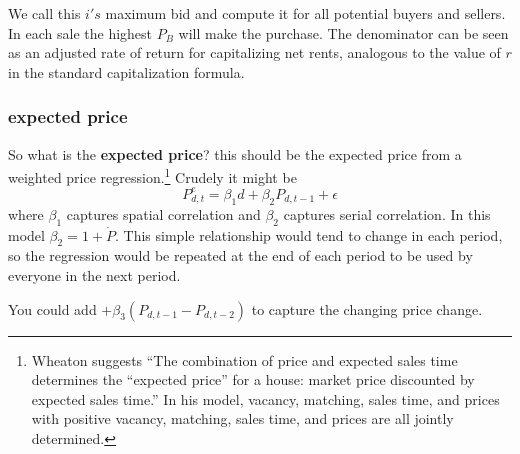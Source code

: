 We call this  $i's$ maximum bid and compute it for all potential buyers and sellers. In each sale the highest $P_B$ will make the purchase. The denominator can be seen as an adjusted rate of return for capitalizing net rents, analogous to the value of $r$ in  the standard capitalization formula. 



\subsubsection{expected price}
So what is the \textbf{expected price}? this should be the expected price from a weighted price regression.\footnote{Wheaton \cite{wheatonVacancySearchPrices1990} suggests ``The combination of price and expected sales time determines the ``expected price'' for a house: market price discounted by expected sales time.'' In his model, vacancy, matching, sales time, and prices with positive vacancy, matching, sales time, and prices are all jointly determined.} Crudely it might be
\[P_{d,t}^e=\beta_1 d + \beta_2 P_{d,t-1} +\epsilon\]
where $\beta_1$ captures spatial correlation and $\beta_2$ captures serial correlation. In this model $\beta_2=1+\dot P$. This simple relationship would tend to change in each period, so the regression would be repeated  at the end of each period  to be used by everyone in the next period. 

You could add $+ \beta_3 (P_{d,t-1}-P_{d,t-2})$ to capture the changing  price change. 







